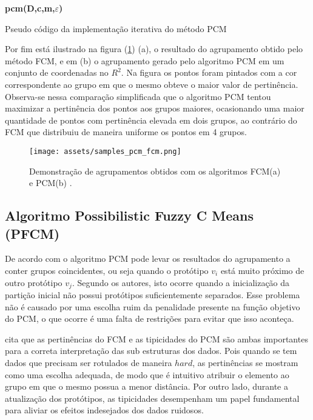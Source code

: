 \begin{algorithm}[H] 
  \SetAlgoLined 
  \textbf{{\color{blue}pcm}(D,c,m,$\varepsilon$)}\\
  \caption{Pseudo código da implementação iterativa do método PCM}
  \label{alg:pcm} 
\end{algorithm}
Por fim está ilustrado na figura (\ref{fig:samples_pcm_fcm}) (a), o resultado do agrupamento
obtido pelo método FCM, e em (b) o agrupamento gerado pelo algoritmo PCM em um conjunto de 
coordenadas no $R^2$. Na figura os pontos foram pintados com a cor correspondente ao grupo em que o 
mesmo obteve o maior valor de pertinência. Observa-se nessa comparação simplificada que o algoritmo 
PCM tentou maximizar a pertinência dos pontos aos grupos maiores, ocasionando uma maior quantidade
de pontos com pertinência elevada em dois grupos, ao contrário do FCM que distribuiu de maneira
uniforme os pontos em 4 grupos.

\begin{figure}[!htp] 
  \centering 
  \texttt{[image: assets/samples\_pcm\_fcm.png]}
  \caption{Demonstração de agrupamentos obtidos com os algoritmos 
    FCM\protect\footnotemark (a) e PCM\protect\footnotemark[\value{footnote}](b)
  .} 
  \label{fig:samples_pcm_fcm} 
\end{figure}

\subsection{Algoritmo Possibilistic Fuzzy C Means (PFCM)} 
De acordo com \cite{Pal2005} o algoritmo PCM pode levar os resultados do agrupamento 
a conter grupos coincidentes, ou seja quando o protótipo $v_i$ está muito próximo de outro protótipo
$v_j$. Segundo os autores, isto ocorre quando a inicialização da partição inicial não possui 
protótipos
suficientemente separados. Esse problema não é causado por uma escolha ruim da penalidade presente
na função objetivo do PCM, o que ocorre é uma falta de restrições para evitar que isso aconteça.

\cite{Carvalho2016} cita que as pertinências do FCM e as tipicidades do PCM são ambas importantes
para a correta interpretação das sub estruturas dos dados. Pois quando se tem dados que precisam
ser rotulados de maneira $hard$, as pertinências se mostram como uma escolha adequada, de modo que é
intuitivo atribuir o elemento ao grupo em que o mesmo possua a menor distância. Por outro lado,
durante a atualização dos protótipos, as tipicidades desempenham um papel fundamental para 
aliviar os efeitos indesejados dos dados ruidosos.


